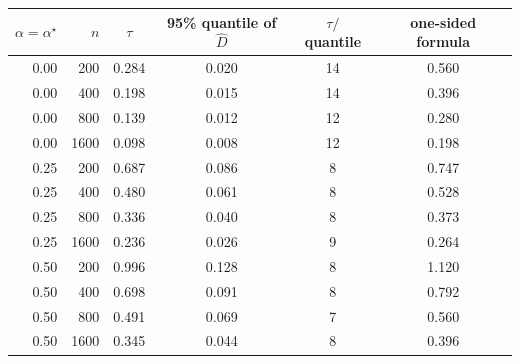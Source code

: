 \begin{tabular}{rrcccc}
\toprule
$\alpha=\alpha^\star$ & $n$ & $\tau$ & 95\% quantile of $\widehat D$ & $\tau/$quantile & one-sided formula \\
\midrule
0.00 & 200 & 0.284 & 0.020 & 14 & 0.560 \\
0.00 & 400 & 0.198 & 0.015 & 14 & 0.396 \\
0.00 & 800 & 0.139 & 0.012 & 12 & 0.280 \\
0.00 & 1600 & 0.098 & 0.008 & 12 & 0.198 \\
0.25 & 200 & 0.687 & 0.086 & 8 & 0.747 \\
0.25 & 400 & 0.480 & 0.061 & 8 & 0.528 \\
0.25 & 800 & 0.336 & 0.040 & 8 & 0.373 \\
0.25 & 1600 & 0.236 & 0.026 & 9 & 0.264 \\
0.50 & 200 & 0.996 & 0.128 & 8 & 1.120 \\
0.50 & 400 & 0.698 & 0.091 & 8 & 0.792 \\
0.50 & 800 & 0.491 & 0.069 & 7 & 0.560 \\
0.50 & 1600 & 0.345 & 0.044 & 8 & 0.396 \\
\bottomrule
\end{tabular}
